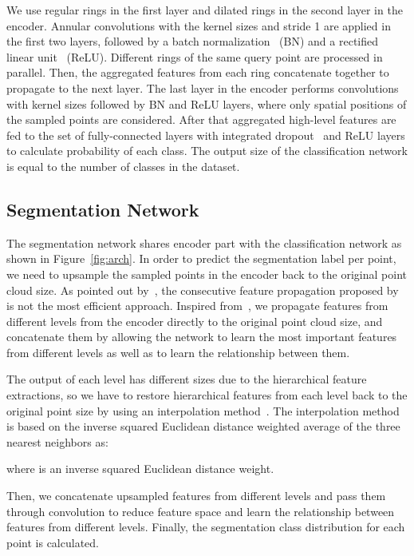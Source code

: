 \documentclass[10pt,twocolumn,letterpaper]{article}
\begin{document}
We use regular rings in the first layer and dilated rings in the second layer in the encoder. Annular convolutions with the kernel sizes  and stride 1 are applied in the first two layers, followed by a batch normalization~\cite{ioffe2015batch} (BN) and a rectified linear unit~\cite{nair2010rectified} (ReLU). Different rings of the same query point are processed in parallel. Then, the aggregated features from each ring concatenate together to propagate to the next layer. The last layer in the encoder performs convolutions with kernel sizes  followed by BN and ReLU layers, where only spatial positions of the sampled points are considered. After that aggregated high-level features are fed to the set of fully-connected layers with integrated dropout~\cite{JMLR:v15:srivastava14a} and ReLU layers to calculate probability of each class. The output size of the classification network is equal to the number of classes in the dataset.
\vspace{-1mm}
\subsection{Segmentation Network}\vspace{-1mm}
The segmentation network shares encoder part with the classification network as shown in Figure~\ref{fig:arch}. In order to predict the segmentation label per point, we need to upsample the sampled points in the encoder back to the original point cloud size. As pointed out by~\cite{yu2018pu}, the consecutive feature propagation proposed by~\cite{qi2017pointnet++} is not the most efficient approach. Inspired from~\cite{yu2018pu}, we propagate features from different levels from the encoder directly to the original point cloud size, and concatenate them by allowing the network to learn the most important features from different levels as well as to learn the relationship between them.

The output of each level has different sizes due to the hierarchical feature extractions, so we have to restore hierarchical features from each level back to the original point size by using an interpolation method~\cite{qi2017pointnet++}. The interpolation method is based on the inverse squared Euclidean distance weighted average of the three nearest neighbors as:\vspace{-2mm}

where  is an inverse squared Euclidean distance weight.

Then, we concatenate upsampled features from different levels and pass them through  convolution to reduce feature space and learn the relationship between features from different levels. Finally, the segmentation class distribution for each point is calculated.
\vspace{-1mm}
\end{document}
